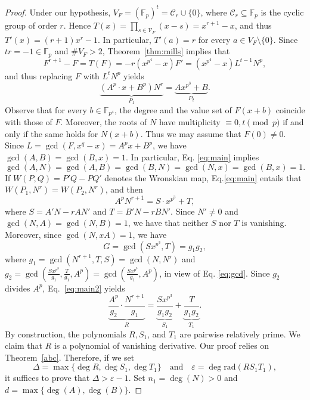 \documentclass[10pt,a4paper]{amsart}
\newcommand{\F}{\mathbb{F}}
\newcommand{\rad}{\mathrm{rad}}
\begin{document}
\begin{proof}
Under our hypothesis, $V_F=(\mathbb{F}_p)^t=\mathcal C_r\cup\{0\}$, where $\mathcal C_r\subseteq \F_{p}$ is the cyclic group of order $r$. Hence  $T(x)=\prod_{s\in \mathcal V_F}(x-s)=x^{r+1}-x$, and thus $T'(x)=(r+1)x^r-1$. In particular, $T'(a)=r$ for every $a\in V_F\setminus \{0\}$. Since $tr=-1\in \F_p$ and $\# V_F>2$, Theorem~\ref{thm:mills} implies that $$F^{r+1}-F=T(F)=-r(x^{p^4}-x)F'=(x^{p^4}-x)L^{t-1}N^p,$$ and thus replacing $F$ with  $L^tN^p$ yields
\begin{equation}\label{eq:main}\underbrace{(A^{p}\cdot x+B^{p})N^r}_{P_1}=\underbrace{Ax^{p^{3}}+B}_{P_2}.\end{equation}
Observe that for every $b\in \F_{p^4}$, the degree and the value set of $F(x+b)$ coincide with those  of $F$. Moreover, the roots of $N$ have multiplicity $\equiv 0, t\pmod p$ if and only if the same holds for $N(x+b)$. Thus we may assume that $F(0)\ne 0$. Since $L=\gcd(F, x^q-x)=A^px+B^p$, we have $\gcd(A, B)=\gcd(B, x)=1$. In particular, Eq. \eqref{eq:main} implies  \begin{equation}\label{eq:gcd}\gcd(A, N)=\gcd(A, B)=\gcd(B, N)=\gcd(N, x)=\gcd(B, x)=1.\end{equation} If $W(P, Q)=P'Q-PQ'$ denotes the Wronskian map, Eq.\eqref{eq:main} entails that $W(P_1, N^r)=W(P_2, N^r)$, and then
\begin{equation}\label{eq:main2} A^{p}N^{r+1}=S\cdot x^{p^{3}}+T,\end{equation}
where $S=A'N-rAN'$ and $T=B'N-rBN'$. 
Since $N'\neq 0$ and $\gcd(N,A)=\gcd(N,B)=1$, we have that neither $S$ nor $T$ is vanishing. Moreover, since  $\gcd(N,xA)=1$, we have  $$G=\gcd(S x^{p^{3}}, T)=g_1g_2,$$ where $g_1=\gcd(N^{r+1}, T, S)=\gcd(N, N')$ and $g_2=\gcd\left(\frac{Sx^{p^3}}{g_1}, \frac{T}{g_1}, A^p\right)=\gcd\left(\frac{Sx^{p^3}}{g_1}, A^p\right)$, in view of Eq. \eqref{eq:gcd}. Since $g_2$ divides $A^p$, Eq.~\eqref{eq:main2} yields
\begin{equation}\label{eq:main3}\underbrace{\frac{A^{p}}{g_2}\cdot\frac{N^{r+1}}{g_1} }_{R}=\underbrace{\frac{Sx^{p^{3}}}{g_1g_2}}_{S_1}+\underbrace{\frac{T}{g_1g_2}}_{T_1}.\end{equation} 
By construction, the polynomials $R, S_1$, and $T_1$ are pairwise relatively prime. We claim  that $R$ is a polynomial of vanishing derivative.
Our proof relies on Theorem~\ref{abc}.  Therefore, if we set  $$\Delta=\max\{\deg R, \deg S_1, \deg T_1 \}\quad\text{and}\quad \varepsilon=\deg \rad(RS_1T_1),$$
it suffices to prove that $\Delta>\varepsilon-1$. Set $n_1=\deg(N)>0$ and $d=\max\{\deg(A), \deg(B)\}$.

\end{proof}
\end{document}
